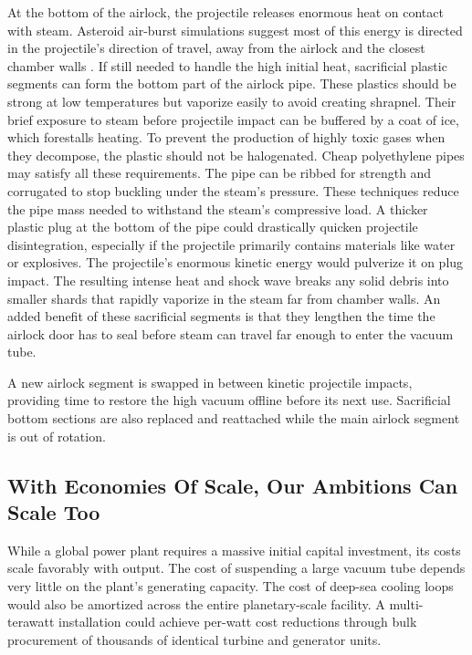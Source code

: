 \documentclass{article}
\begin{document}
At the bottom of the airlock, the projectile releases enormous heat on contact with steam. Asteroid air-burst simulations suggest most of this energy is directed in the projectile's direction of travel, away from the airlock and the closest chamber walls \cite{tunguska_downwards}. If still needed to handle the high initial heat, sacrificial plastic segments can form the bottom part of the airlock pipe. These plastics should be strong at low temperatures but vaporize easily to avoid creating shrapnel. Their brief exposure to steam before projectile impact can be buffered by a coat of ice, which forestalls heating. To prevent the production of highly toxic gases when they decompose, the plastic should not be halogenated. Cheap polyethylene pipes may satisfy all these requirements.  The pipe can be ribbed for strength and corrugated to stop buckling under the steam's pressure.  These techniques reduce the pipe mass needed to withstand the steam's compressive load.  A thicker plastic plug at the bottom of the pipe could drastically quicken projectile disintegration, especially if the projectile primarily contains materials like water or explosives. The projectile's enormous kinetic energy would pulverize it on plug impact. The resulting intense heat and shock wave breaks any solid debris into smaller shards that rapidly vaporize in the steam far from chamber walls.  An added benefit of these sacrificial segments is that they lengthen the time the airlock door has to seal before steam can travel far enough to enter the vacuum tube.

A new airlock segment is swapped in between kinetic projectile impacts, providing time to restore the high vacuum offline before its next use. Sacrificial bottom sections are also replaced and reattached while the main airlock segment is out of rotation.

\subsection{With Economies Of Scale, Our Ambitions Can Scale Too}\label{sec:strawway_economics}

While a global power plant requires a massive initial capital investment, its costs scale favorably with output. The cost of suspending a large vacuum tube depends very little on the plant's generating capacity. The cost of deep-sea cooling loops would also be amortized across the entire planetary-scale facility.  A multi-terawatt installation could achieve per-watt cost reductions through bulk procurement of thousands of identical turbine and generator units. 
\end{document}
